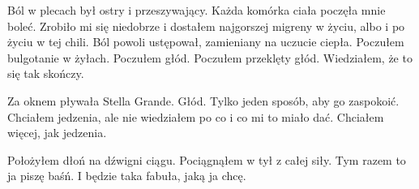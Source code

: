 Ból w plecach był ostry i przeszywający.
Każda komórka ciała poczęła mnie boleć.
Zrobiło mi się niedobrze i dostałem najgorszej migreny w życiu, albo i po życiu w tej chili.
Ból powoli ustępował, zamieniany na uczucie ciepła.
Poczułem bulgotanie w żyłach.
Poczułem głód.
Poczułem przeklęty głód.
Wiedziałem, że to się tak skończy.

Za oknem pływała Stella Grande. Głód. Tylko jeden sposób, aby go zaspokoić.
Chciałem jedzenia, ale nie wiedziałem po co i co mi to miało dać.
Chciałem więcej, jak jedzenia.

Położyłem dłoń na dźwigni ciągu.
Pociągnąłem w tył z całej siły.
Tym razem to ja piszę baśń.
I będzie taka fabuła, jaką ja chcę.



